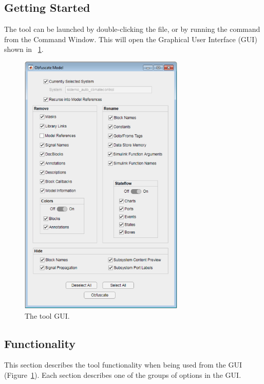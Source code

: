 \documentclass{article}
\begin{document}
\subsection{Getting Started}
The tool can be launched by double-clicking the  file, or by running the command  from the Command Window. This will open the Graphical User Interface (GUI) shown in \figurename~\ref{fig:contextMenu}.

\begin{figure}[htb!]
	\centering
	\includegraphics[width=0.7\textwidth]{../figs/GUI}
	\caption{The tool GUI.}
	\label{fig:contextMenu}
\end{figure}

\newpage
\subsection{Functionality}
This section describes the tool functionality when being used from the GUI (Figure~\ref{fig:contextMenu}). Each section describes one of the groups of options in the GUI.
\end{document}
